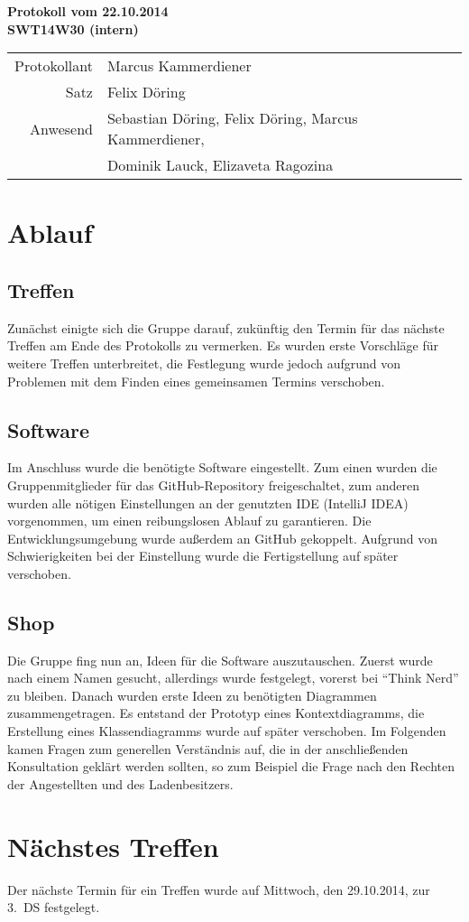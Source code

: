\documentclass{scrartcl}
\begin{document}
\begin{center}
\LARGE \bf{Protokoll vom 22.10.2014 \\
SWT14W30 (intern)}
\end{center}

\begin{tabular}{rp{10cm}}
Protokollant & Marcus Kammerdiener \\
Satz & Felix Döring \\
Anwesend & Sebastian Döring, Felix Döring, Marcus Kammerdiener,\\
& Dominik Lauck, Elizaveta Ragozina \\
\end{tabular}

\vspace*{3em}

\section{Ablauf}
\subsection{Treffen}
Zunächst einigte sich die Gruppe darauf, zukünftig den Termin für das nächste Treffen am Ende des Protokolls zu vermerken. Es wurden erste Vorschläge für weitere Treffen unterbreitet, die Festlegung wurde jedoch aufgrund von Problemen mit dem Finden eines gemeinsamen Termins verschoben.
\subsection{Software}
Im Anschluss wurde die benötigte Software eingestellt. Zum einen wurden die Gruppenmitglieder für das GitHub-Repository freigeschaltet, zum anderen wurden alle nötigen Einstellungen an der genutzten IDE (IntelliJ IDEA) vorgenommen, um einen reibungslosen Ablauf zu garantieren. Die Entwicklungsumgebung wurde außerdem an GitHub gekoppelt. Aufgrund von Schwierigkeiten bei der Einstellung wurde die Fertigstellung auf später verschoben.
\subsection{Shop}
Die Gruppe fing nun an, Ideen für die Software auszutauschen. Zuerst wurde nach einem Namen gesucht, allerdings wurde festgelegt, vorerst bei "`Think Nerd"' zu bleiben. Danach wurden erste Ideen zu benötigten Diagrammen zusammengetragen. Es entstand der Prototyp eines Kontextdiagramms, die Erstellung eines Klassendiagramms wurde auf später verschoben. Im Folgenden kamen Fragen zum generellen Verständnis auf, die in der anschlie\ss{}enden Konsultation geklärt werden sollten, so zum Beispiel die Frage nach den Rechten der Angestellten und des Ladenbesitzers.
\section{N\"achstes Treffen}
Der nächste Termin für ein Treffen wurde auf Mittwoch, den 29.10.2014, zur 3.~DS festgelegt.
\end{document}
